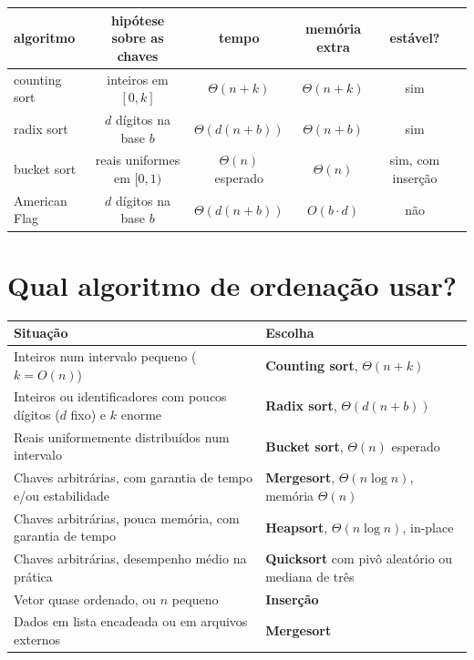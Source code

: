 \begin{center}\small
\begin{tabular}{@{}lccccc@{}}
\toprule
algoritmo & hipótese sobre as chaves & tempo & memória extra & estável?\\
\midrule
counting sort & inteiros em $[0,k]$ & $\Theta(n+k)$ & $\Theta(n+k)$ & sim\\
radix sort & $d$ dígitos na base $b$ & $\Theta(d(n+b))$ & $\Theta(n+b)$ & sim\\
bucket sort & reais uniformes em $[0,1)$ & $\Theta(n)$ esperado & $\Theta(n)$ & sim, com inserção\\
American Flag & $d$ dígitos na base $b$ & $\Theta(d(n+b))$ & $O(b\cdot d)$ & não\\
\bottomrule
\end{tabular}
\end{center}

\section{Qual algoritmo de ordenação usar?}\label{sec:escolhasort}
\begin{center}
\small
\begin{tabularx}{\linewidth}{@{}lX@{}}
\toprule
Situação & Escolha\\
\midrule
Inteiros num intervalo pequeno ($k=O(n)$) & \textbf{Counting sort}, $\Theta(n+k)$\\
Inteiros ou identificadores com poucos dígitos ($d$ fixo) e $k$ enorme & \textbf{Radix sort}, $\Theta(d(n+b))$\\
Reais uniformemente distribuídos num intervalo & \textbf{Bucket sort}, $\Theta(n)$ esperado\\
Chaves arbitrárias, com garantia de tempo e/ou estabilidade & \textbf{Mergesort}, $\Theta(n\log n)$, memória $\Theta(n)$\\
Chaves arbitrárias, pouca memória, com garantia de tempo & \textbf{Heapsort}, $\Theta(n\log n)$, in-place\\
Chaves arbitrárias, desempenho médio na prática & \textbf{Quicksort} com pivô aleatório ou mediana de três\\
Vetor quase ordenado, ou $n$ pequeno & \textbf{Inserção}\\
Dados em lista encadeada ou em arquivos externos & \textbf{Mergesort}\\
\bottomrule
\end{tabularx}
\end{center}

